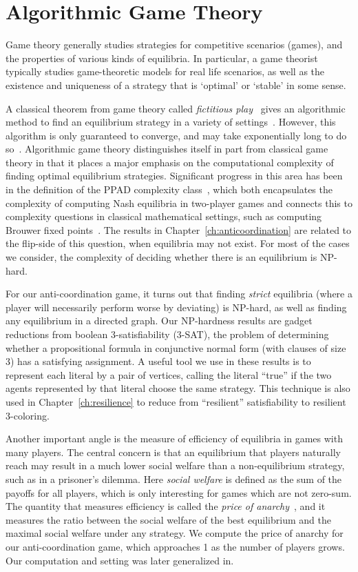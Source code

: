 \section{Algorithmic Game Theory}

Game theory generally studies strategies for competitive scenarios (games), and
the properties of various kinds of equilibria. In particular, a game theorist
typically studies game-theoretic models for real life scenarios, as well as the
existence and uniqueness of a strategy that is `optimal' or `stable' in some
sense.

A classical theorem from game theory called \emph{fictitious
play}~\cite{Robinson51} gives an algorithmic method to find an equilibrium
strategy in a variety of settings~\cite{MondererS96,Berger05,Nachbar90}.
However, this algorithm is only guaranteed to converge, and may take
exponentially long to do so~\cite{DaskalakisGP09}. Algorithmic game theory
distinguishes itself in part from classical game theory in that it places a
major emphasis on the computational complexity of finding optimal equilibrium
strategies. Significant progress in this area has been in the definition of the
PPAD complexity class~\cite{Papadimitriou94}, which both encapsulates the
complexity of computing Nash equilibria in two-player games and connects this
to complexity questions in classical mathematical settings, such as computing
Brouwer fixed points~\cite{ChenD09}. The results in
Chapter~\ref{ch:anticoordination} are related to the flip-side of this
question, when equilibria may not exist. For most of the cases we consider, the
complexity of deciding whether there is an equilibrium is NP-hard.

For our anti-coordination game, it turns out that finding \emph{strict}
equilibria (where a player will necessarily perform worse by deviating) is
NP-hard, as well as finding any equilibrium in a directed graph. Our
NP-hardness results are gadget reductions from boolean 3-satisfiability
(3-SAT), the problem of determining whether a propositional formula in
conjunctive normal form (with clauses of size 3) has a satisfying assignment. A
useful tool we use in these results is to represent each literal by a pair of
vertices, calling the literal ``true'' if the two agents represented by that
literal choose the same strategy. This technique is also used in
Chapter~\ref{ch:resilience} to reduce from ``resilient'' satisfiability to
resilient 3-coloring. 

Another important angle is the measure of efficiency of equilibria in games
with many players. The central concern is that an equilibrium that players
naturally reach may result in a much lower social welfare than a
non-equilibrium strategy, such as in a prisoner's dilemma. Here \emph{social
welfare} is defined as the sum of the payoffs for all players, which is only
interesting for games which are not zero-sum. The quantity that measures
efficiency is called the \emph{price of anarchy}~\cite{KP99}, and it measures
the ratio between the social welfare of the best equilibrium and the maximal
social welfare under any strategy. We compute the price of anarchy for our
anti-coordination game, which approaches 1 as the number of players grows. Our
computation and setting was later generalized in\cite{FeldmanF15}.


